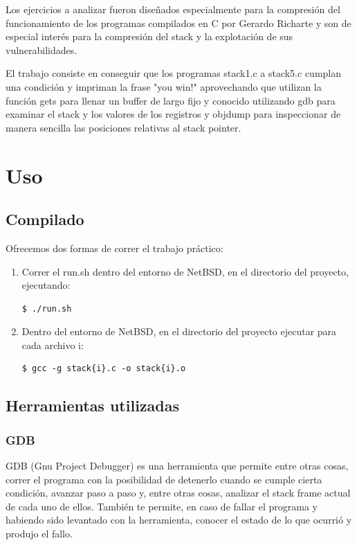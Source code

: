 \documentclass[a4paper,10pt]{article}
\begin{document}
Los ejercicios a analizar fueron diseñados especialmente para la compresión del funcionamiento de los programas compilados en C por Gerardo Richarte y son de especial interés para la compresión del stack y la explotación de sus vulnerabilidades.
\par El trabajo consiste en conseguir que los programas stack1.c a stack5.c cumplan una condición y impriman la frase "you win!" aprovechando que utilizan la función gets para llenar un buffer de largo fijo y conocido utilizando gdb para examinar el stack y los valores de los registros y objdump para inspeccionar de manera sencilla las posiciones relativas al stack pointer.


\newpage
\section{Uso}
\subsection{Compilado}
Ofrecemos dos formas de correr el trabajo práctico:
\begin{enumerate}
\item  Correr el run.sh dentro del entorno de NetBSD, en el directorio del proyecto, ejecutando:
	\begin{verbatim}
$ ./run.sh
\end{verbatim}
\item Dentro del entorno de NetBSD, en el directorio del proyecto ejecutar para cada archivo i:
\begin{verbatim}
$ gcc -g stack{i}.c -o stack{i}.o
\end{verbatim}
\end{enumerate}



\subsection{Herramientas utilizadas}
\subsubsection{GDB}

GDB (Gnu Project Debugger) es una herramienta que permite entre otras cosas, correr el programa con la posibilidad de detenerlo cuando se cumple cierta condición, avanzar paso a paso y, entre otras cosas, analizar el stack frame actual de cada uno de ellos. También te permite, en caso de fallar el programa y habiendo sido levantado con la herramienta, conocer el estado de lo que ocurrió y produjo el fallo.
\end{document}
